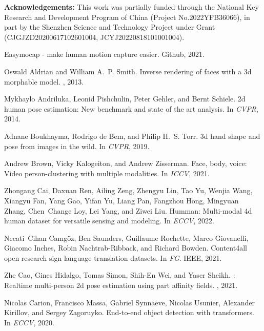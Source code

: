 \documentclass[10pt,twocolumn,letterpaper]{article}
\begin{document}
\textbf{Acknowledgements:} This work was partially funded through the National Key Research and Development Program of China (Project No.2022YFB36066), in part by the Shenzhen Science and Technology Project under Grant (CJGJZD20200617102601004, JCYJ20220818101001004). \begin{thebibliography}{10}\itemsep=-1pt

Easymocap - make human motion capture easier.
\newblock Github, 2021.

Oswald Aldrian and William A.~P. Smith.
\newblock Inverse rendering of faces with a 3d morphable model.
, 2013.

Mykhaylo Andriluka, Leonid Pishchulin, Peter Gehler, and Bernt Schiele.
\newblock 2d human pose estimation: New benchmark and state of the art
  analysis.
\newblock In {\em CVPR}, 2014.

Adnane Boukhayma, Rodrigo de Bem, and Philip H.~S. Torr.
\newblock 3d hand shape and pose from images in the wild.
\newblock In {\em CVPR}, 2019.

Andrew Brown, Vicky Kalogeiton, and Andrew Zisserman.
\newblock Face, body, voice: Video person-clustering with multiple modalities.
\newblock In {\em ICCV}, 2021.

Zhongang Cai, Daxuan Ren, Ailing Zeng, Zhengyu Lin, Tao Yu, Wenjia Wang,
  Xiangyu Fan, Yang Gao, Yifan Yu, Liang Pan, Fangzhou Hong, Mingyuan Zhang,
  Chen~Change Loy, Lei Yang, and Ziwei Liu.
\newblock Humman: Multi-modal 4d human dataset for versatile sensing and
  modeling.
\newblock In {\em ECCV}, 2022.

Necati~Cihan Camg{\"o}z, Ben Saunders, Guillaume Rochette, Marco Giovanelli,
  Giacomo Inches, Robin Nachtrab-Ribback, and Richard Bowden.
\newblock Content4all open research sign language translation datasets.
\newblock In {\em FG}. IEEE, 2021.

Zhe Cao, Gines Hidalgo, Tomas Simon, Shih-En Wei, and Yaser Sheikh.
: Realtime multi-person 2d pose estimation using part
  affinity fields.
, 2021.

Nicolas Carion, Francisco Massa, Gabriel Synnaeve, Nicolas Usunier, Alexander
  Kirillov, and Sergey Zagoruyko.
\newblock End-to-end object detection with transformers.
\newblock In {\em ECCV}, 2020.


\end{thebibliography}
\end{document}
